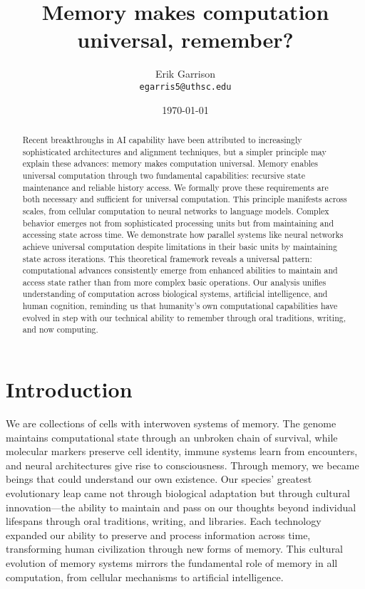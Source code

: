 \documentclass[12pt]{article}
\title{Memory makes computation universal, remember?}
\author{Erik Garrison\\
  \texttt{egarris5@uthsc.edu}\\[1ex]
  }
\date{\today}
\begin{document}
\maketitle

\begin{abstract}
Recent breakthroughs in AI capability have been attributed to increasingly sophisticated architectures and alignment techniques, but a simpler principle may explain these advances: memory makes computation universal.
Memory enables universal computation through two fundamental capabilities: recursive state maintenance and reliable history access.
We formally prove these requirements are both necessary and sufficient for universal computation.
This principle manifests across scales, from cellular computation to neural networks to language models.
Complex behavior emerges not from sophisticated processing units but from maintaining and accessing state across time.
We demonstrate how parallel systems like neural networks achieve universal computation despite limitations in their basic units by maintaining state across iterations.
This theoretical framework reveals a universal pattern: computational advances consistently emerge from enhanced abilities to maintain and access state rather than from more complex basic operations.
Our analysis unifies understanding of computation across biological systems, artificial intelligence, and human cognition, reminding us that humanity's own computational capabilities have evolved in step with our technical ability to remember through oral traditions, writing, and now computing.
\end{abstract}

\section{Introduction}

We are collections of cells with interwoven systems of memory.
The genome maintains computational state through an unbroken chain of survival, while molecular markers preserve cell identity, immune systems learn from encounters, and neural architectures give rise to consciousness.
Through memory, we became beings that could understand our own existence.
Our species' greatest evolutionary leap came not through biological adaptation but through cultural innovation---the ability to maintain and pass on our thoughts beyond individual lifespans through oral traditions, writing, and libraries.
Each technology expanded our ability to preserve and process information across time, transforming human civilization through new forms of memory.
This cultural evolution of memory systems mirrors the fundamental role of memory in all computation, from cellular mechanisms to artificial intelligence.
\end{document}
